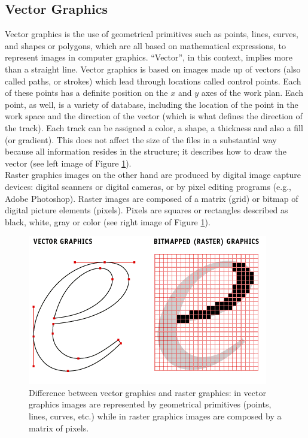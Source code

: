 \documentclass[]{usiinfbachelorproject}
\begin{document}

\subsection{Vector Graphics}

Vector graphics is the use of geometrical primitives such as points, lines, curves, and shapes or polygons, which are all based on mathematical expressions, to represent images in computer graphics. ``Vector'', in this context, implies more than a straight line.
Vector graphics is based on images made up of vectors (also called paths, or strokes) which lead through locations called control points. Each of these points has a definite position on the $x$ and $y$ axes of the work plan. Each point, as well, is a variety of database, including the location of the point in the work space and the direction of the vector (which is what defines the direction of the track). Each track can be assigned a color, a shape, a thickness and also a fill (or gradient). This does not affect the size of the files in a substantial way because all information resides in the structure; it describes how to draw the vector (see left image of Figure \ref{fig:vector_raster}).\\
Raster graphics images on the other hand are produced by digital image capture devices: digital scanners or digital cameras, or by pixel editing programs (e.g., Adobe Photoshop). Raster images are composed of a matrix (grid) or bitmap of digital picture elements (pixels). Pixels are squares or rectangles described as black, white, gray or color (see right image of Figure \ref{fig:vector_raster}).

\begin{figure} [ht]
	\centering
	\includegraphics[scale=0.7]{img/vector_raster.png}
	\caption{Difference between vector graphics and raster graphics: in vector graphics images are represented by geometrical primitives (points, lines, curves, etc.) while in raster graphics images are composed by a matrix of pixels.}
	\label{fig:vector_raster}
\end{figure}
\end{document}

